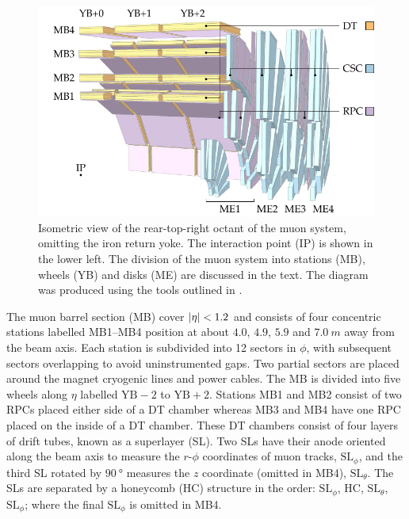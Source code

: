 \begin{figure}[htbp]
    \centering
    \includegraphics{diagrams/tikz/cms/annotated/cms_muon.pdf}
    \caption{
        Isometric view of the rear-top-right octant of the muon system,
        omitting the iron return yoke. The interaction point (IP) is shown in
        the lower left. The division of the muon system into stations (MB),
        wheels (YB) and disks (ME) are discussed in the text. The diagram was
        produced using the tools outlined in \cite{Sakuma:2013jqa}.
    }
    \label{fig:cms-muon}
\end{figure}

The muon barrel section (MB) cover ${|\eta|<1.2}$ and consists of four concentric stations labelled MB1--MB4 position at about $4.0$, $4.9$, $5.9$ and ${\SI{7.0}{m}}$ away from the beam axis. Each station is subdivided into 12 sectors in $\phi$, with subsequent sectors overlapping to avoid uninstrumented gaps. Two partial sectors are placed around the magnet cryogenic lines and power cables. The MB is divided into five wheels along $\eta$ labelled $\mathrm{YB}-2$ to $\mathrm{YB}+2$. Stations MB1 and MB2 consist of two RPCs placed either side of a DT chamber whereas MB3 and MB4 have one RPC placed on the inside of a DT chamber. These DT chambers consist of four layers of drift tubes, known as a superlayer (SL). Two SLs have their anode oriented along the beam axis to measure the $r$-$\phi$ coordinates of muon tracks, $\mathrm{SL}_{\phi}$, and the third SL rotated by ${\SI{90}{\degree}}$ measures the $z$ coordinate (omitted in MB4), $\mathrm{SL}_{\theta}$. The SLs are separated by a honeycomb (HC) structure in the order: $\mathrm{SL}_{\phi}$, HC, $\mathrm{SL}_{\theta}$, $\mathrm{SL}_{\phi}$; where the final $\mathrm{SL}_{\phi}$ is omitted in MB4.

